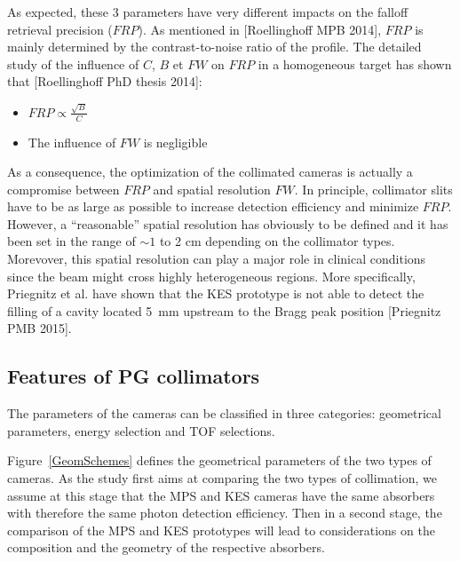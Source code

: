 \documentclass[a4paper,english]{article}
\begin{document}
As expected, these 3 parameters have very different impacts on the falloff retrieval precision ($FRP$). As mentioned in [Roellinghoff MPB 2014], $FRP$ is mainly determined by the contrast-to-noise ratio of the profile. The detailed study of the influence of $C$, $B$ et $FW$ on $FRP$ in a homogeneous target has shown that [Roellinghoff PhD thesis 2014]:
\begin{itemize}
 \item $FRP\propto \frac{\sqrt{B}}{C}$
 \item The influence of $FW$ is negligible
\end{itemize}

As a consequence, the optimization of the collimated cameras is actually a compromise between $FRP$ and spatial resolution $FW$. In principle, collimator slits have to be as large as possible to increase detection efficiency and minimize $FRP$. However, a \enquote{reasonable} spatial resolution has obviously to be defined and it has been set in the range of $\sim1$ to 2 cm depending on the collimator types. Morevover, this spatial resolution can play a major role in clinical conditions since the beam might cross highly heterogeneous regions. More specifically, Priegnitz et al. have shown that the KES prototype is not able to detect the filling of a cavity located 5~mm upstream to the Bragg peak position [Priegnitz PMB 2015].


\subsection{Features of PG collimators}



The parameters of the cameras can be classified in three categories: geometrical parameters, energy selection and TOF selections.

Figure~\ref{GeomSchemes} defines the geometrical parameters of the two types of cameras. As the study first aims at comparing the two types of collimation, we assume at this stage that the MPS and KES cameras have the same absorbers with therefore the same photon detection efficiency. Then in a second stage, the comparison of the MPS and KES prototypes will lead to considerations on the composition and the geometry of the respective absorbers.
\end{document}
